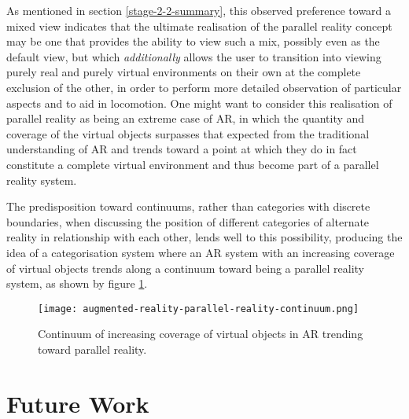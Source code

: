 As mentioned in section \ref{stage-2-2-summary}, this observed preference toward a mixed view indicates that the ultimate realisation of the parallel reality concept may be one that provides the ability to view such a mix, possibly even as the default view, but which \textit{additionally} allows the user to transition into viewing purely real and purely virtual environments on their own at the complete exclusion of the other, in order to perform more detailed observation of particular aspects and to aid in locomotion. One might want to consider this realisation of parallel reality as being an extreme case of AR, in which the quantity and coverage of the virtual objects surpasses that expected from the traditional understanding of AR and trends toward a point at which they do in fact constitute a complete virtual environment and thus become part of a parallel reality system.

The predisposition toward continuums, rather than categories with discrete boundaries, when discussing the position of different categories of alternate reality in relationship with each other, lends well to this possibility, producing the idea of a categorisation system where an AR system with an increasing coverage of virtual objects trends along a continuum toward being a parallel reality system, as shown by figure \ref{augmented-reality-parallel-reality-continuum.png}.

\begin{figure}[h]
	\begin{center}
		\texttt{[image: augmented-reality-parallel-reality-continuum.png]}
		\caption{Continuum of increasing coverage of virtual objects in AR trending toward parallel reality.}
		\label{augmented-reality-parallel-reality-continuum.png}
	\end{center}	
\end{figure}



\section{Future Work}

